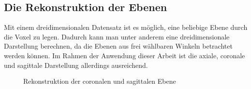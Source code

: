 \FloatBarrier
\subsection{Die Rekonstruktion der Ebenen}

Mit einem dreidimensionalen Datensatz ist es möglich, eine beliebige Ebene durch die Voxel zu legen. Dadurch kann man unter anderem eine dreidimensionale Darstellung berechnen, da die Ebenen aus frei wählbaren Winkeln betrachtet werden können. Im Rahmen der Anwendung dieser Arbeit ist die axiale, coronale und sagittale Darstellung allerdings ausreichend.

\begin{figure}[htb]
\centering
{}
\caption{Rekonstruktion der coronalen und sagittalen Ebene}
\label{mpr}
\end{figure}

